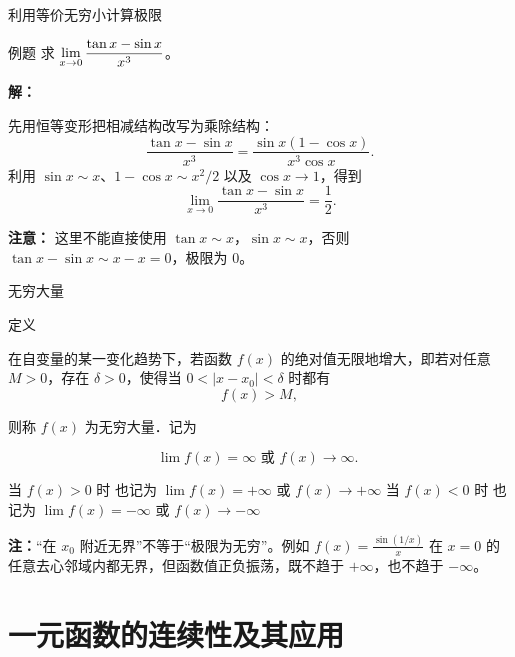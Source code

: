 \documentclass[aspectratio=169,10pt]{ctexbeamer}
\begin{document}
\begin{frame}{利用等价无穷小计算极限}
	\begin{block}{例题}
		求 \(\lim\limits\limits_{x \to 0} \dfrac{\tan x - \sin x}{x^3}\)。
	\end{block}
	
	
	
	\pause
	
	\vspace{0.5cm}
	
	\textbf{解：}
	
		先用恒等变形把相减结构改写为乘除结构：
	\[
	\frac{\tan x-\sin x}{x^3}
	=\frac{\sin x(1-\cos x)}{x^3\cos x}.
	\]
	利用 \(\sin x\sim x\)、\(1-\cos x\sim x^2/2\) 以及 \(\cos x\to1\)，得到
	\[
	\lim\limits_{x\to0}\frac{\tan x-\sin x}{x^3}
	=\frac12.
	\]
	
	\textbf{注意：} 这里不能直接使用 \(\tan x \sim x\)，\(\sin x \sim x\)，否则 \(\tan x - \sin x \sim x - x = 0\)，极限为 0。
	
	
	
\end{frame}

\begin{frame}{无穷大量}
		\begin{block}{定义}
			
			
			在自变量的某一变化趋势下，若函数 $f(x)$ 的绝对值无限地增大，即若对任意 \(M>0\)，存在 \(\delta>0\)，使得当 \(0<|x-x_0|<\delta\) 时都有
			\[
			f(x)>M,
			\]
			
			
			
			
			则称 $f(x)$ 为无穷大量．记为
			
			$$
			\lim\limits f(x)=\infty \text { 或 } f(x) \rightarrow \infty \text {. }
			$$
			
			
			当 $f(x)>0$ 时 也记为 $\lim\limits f(x)=+\infty$ 或 $f(x) \rightarrow+\infty$
			当 $f(x)<0$ 时 也记为 $\lim\limits f(x)=-\infty$ 或 $f(x) \rightarrow-\infty$
		
		
	\end{block}
	
	\vspace{0.4cm}
	\textbf{注：}“在 \(x_0\) 附近无界”不等于“极限为无穷”。例如 \(f(x)=\frac{\sin(1/x)}{x}\) 在 \(x=0\) 的任意去心邻域内都无界，但函数值正负振荡，既不趋于 \(+\infty\)，也不趋于 \(-\infty\)。
\end{frame}




\section{一元函数的连续性及其应用}
\end{document}
